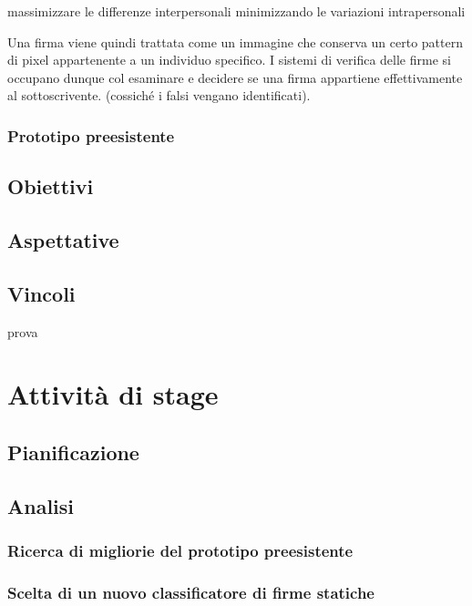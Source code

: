 massimizzare le differenze interpersonali minimizzando le variazioni intrapersonali 



Una firma viene quindi trattata come un immagine che conserva un certo pattern di pixel appartenente a un individuo specifico. I sistemi di verifica delle firme si occupano dunque col esaminare e decidere se una firma appartiene effettivamente al sottoscrivente. (cossiché i falsi vengano identificati).

\subsubsection{Prototipo preesistente}
\label{2.1.1}

\subsection{Obiettivi}
\label{2.2}

\subsection{Aspettative}
\label{2.3}

\subsection{Vincoli}
\label{2.4}
\gls{prova}

\newpage

\section{Attività di stage}
\label{3.0}

\subsection{Pianificazione}
\label{3.1}

\subsection{Analisi}
\label{3.2}

\subsubsection{Ricerca di migliorie del prototipo preesistente}
\label{3.2.1}

\subsubsection{Scelta di un nuovo classificatore di firme statiche}
\label{3.2.2}

